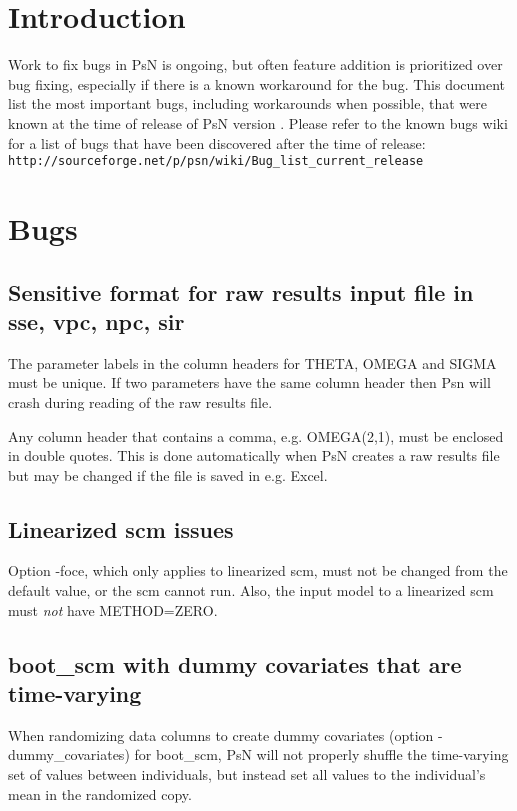 




\maketitle

\section{Introduction}
Work to fix bugs in PsN is ongoing, but often feature addition is prioritized over bug fixing, 
especially if there is a known workaround for the bug. This document list the most important bugs, including workarounds when possible,
that were known at the time of release of PsN version \psnversion. Please refer to the known bugs wiki
for a list of bugs that have been discovered after the time of release:\\
\texttt{http://sourceforge.net/p/psn/wiki/Bug\_list\_current\_release}   

\section{Bugs}
\subsection{Sensitive format for raw results input file in sse, vpc, npc, sir}
The parameter labels in the column headers for THETA, OMEGA and SIGMA must be unique. If two parameters have the same
column header then Psn will crash during reading of the raw results file.

Any column header that contains a comma, e.g. OMEGA(2,1), must be enclosed in double quotes. This is done automatically when PsN creates a raw results file but may be changed if the file is saved in e.g. Excel.

\subsection{Linearized scm issues}
Option -foce, which only applies to linearized scm, must not be changed from
the default value, or the scm cannot run. 
Also, the input model to a linearized scm must \emph{not}
have METHOD=ZERO.

\subsection{boot\_scm with dummy covariates that are time-varying}
When randomizing data columns to create dummy covariates 
(option -dummy\_covariates) for boot\_scm, PsN will not properly
shuffle the time-varying set of values between individuals,
but instead set all values to the individual's mean in the randomized copy.


